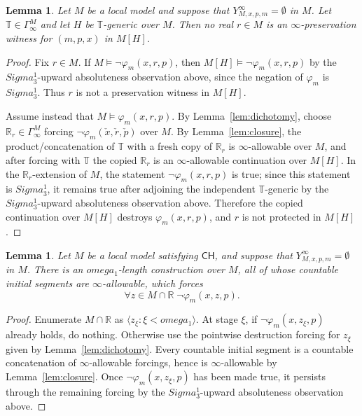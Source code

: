 \documentclass{article}
\newtheorem{lemma}[theorem]{Lemma}
\theoremstyle{remark}
\theoremstyle{plain}
\newcommand{\forceR}{\mathbb{R}}
\newcommand{\CH}{\mathsf{CH}}
\newcommand{\Real}{\mathbb{R}}
\def\Sigma{Sigma}%
\def\omega{omega}%
\begin{document}
\begin{lemma}\label{lem:old-reals-not-protected}
Let $M$ be a local model and suppose that $Y^\infty_{M,x,p,m}=\emptyset$ in $M$.
Let $\mathbb T\in\Gamma^M_\infty$ and let $H$ be $\mathbb T$-generic over $M$.
Then no real $r\in M$ is an $\infty$-preservation witness for $(m,p,x)$ in
$M[H]$.
\end{lemma}

\begin{proof}
Fix $r\in M$. If $M\models\neg\varphi_m(x,r,p)$, then
$M[H]\models\neg\varphi_m(x,r,p)$ by the $\Sigma^1_3$-upward
absoluteness observation above, since the negation of $\varphi_m$ is
$\Sigma^1_3$. Thus $r$ is not a preservation witness
in $M[H]$.

Assume instead that $M\models\varphi_m(x,r,p)$. By
Lemma~\ref{lem:dichotomy}, choose $\forceR_r\in\Gamma^M_\infty$ forcing
$\neg\varphi_m(\check x,\check r,\check p)$ over $M$. By Lemma~\ref{lem:closure},
the product/concatenation of $\mathbb T$ with a fresh copy of $\forceR_r$ is
$\infty$-allowable over $M$, and after forcing with $\mathbb T$ the copied
$\forceR_r$ is an $\infty$-allowable continuation over $M[H]$. In the
$\forceR_r$-extension of $M$, the statement $\neg\varphi_m(x,r,p)$ is true; since
this statement is $\Sigma^1_3$, it remains true after adjoining the independent
$\mathbb T$-generic by the $\Sigma^1_3$-upward absoluteness observation
above. Therefore the copied continuation over $M[H]$ destroys $\varphi_m(x,r,p)$, and $r$ is not protected in
$M[H]$.
\end{proof}

\begin{lemma}\label{lem:clearing-old-candidates}
Let $M$ be a local model satisfying $\CH$, and suppose that
$Y^\infty_{M,x,p,m}=\emptyset$ in $M$. There is an $\omega_1$-length construction
over $M$, all of whose countable initial segments are $\infty$-allowable, which
forces
\[
   \forall z\in M\cap\Real\;\neg\varphi_m(x,z,p).
\]
\end{lemma}

\begin{proof}
Enumerate $M\cap\Real$ as $\langle z_\xi:\xi<\omega_1\rangle$. At stage $\xi$,
if $\neg\varphi_m(x,z_\xi,p)$ already holds, do nothing. Otherwise use the
pointwise destruction forcing for $z_\xi$ given by Lemma~\ref{lem:dichotomy}.
Every countable initial segment is a countable concatenation of
$\infty$-allowable forcings, hence is $\infty$-allowable by
Lemma~\ref{lem:closure}. Once $\neg\varphi_m(x,z_\xi,p)$ has been made true, it
persists through the remaining forcing by the $\Sigma^1_3$-upward
absoluteness observation above.
\end{proof}
\end{document}
